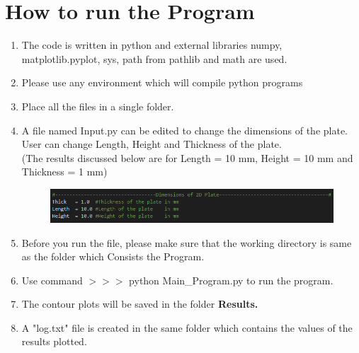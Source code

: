 \documentclass[12pt]{article}
\begin{document}
\newpage

\section{How to run the Program}
\begin{enumerate}[leftmargin=*]
	\item The code is written in python and external libraries numpy, matplotlib.pyplot, sys, path from pathlib and math are used.
	\item Please use any environment which will compile python programs
	\item Place all the files in a single folder.
	\item A file named Input.py can be edited to change the dimensions of the plate. User can change Length, Height and Thickness of the plate. \\(The results discussed below are for Length = 10 mm, Height = 10 mm and Thickness = 1 mm)
	\begin{figure}[H]
		\begin{center}
			\includegraphics[scale=0.8]{Input.png} 
		\end{center}	
	\end{figure}
	\item Before you run the file, please make sure that the working directory is same as the folder  which
	Consists the Program.
	\item Use command  $>>>$ python Main\_Program.py to run the program.
	\item The contour plots will be saved in the folder \textbf{Results.}
	\item A "log.txt" file is created in the same folder which contains the values of the results plotted.
	
	
\end{enumerate}

\newpage
\end{document}
